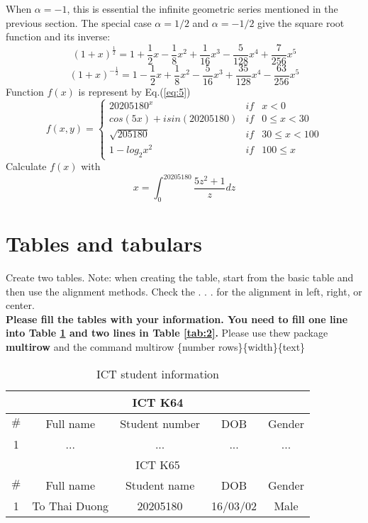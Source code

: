 \documentclass{article}
\begin{document}
When $\alpha = -1$, this is essential the infinite geometric series mentioned in the previous section. The special case $\alpha=1/2$ and $\alpha=-1/2$ give the square root function and its inverse:
\begin{equation}
(1+x)^{\frac{1}{2}}=1+\frac{1}{2}x-\frac{1}{8}x^2+\frac{1}{16}x^3-\frac{5}{128}x^4+\frac{7}{256}x^5
\end{equation}
\begin{equation}
(1+x)^{-\frac{1}{2}}=1-\frac{1}{2}x+\frac{1}{8}x^2-\frac{5}{16}x^3+\frac{35}{128}x^4-\frac{63}{256}x^5
\end{equation}
Function $f(x)$ is represent by Eq.(\ref{eq:5})
\begin{equation}
f(x,y)=
\left \{
\begin{array}{ccl}
20205180^x & if & x<0\\
cos(5x)+isin(20205180) & if & 0 \leq x < 30\\
\sqrt{205180} & if & 30 \leq x <100\\
1-log_{2}x^2 & if & 100 \leq x
\end{array}
\label{eq:5}
\right .
\end{equation}
Calculate $f(x)$ with
\begin{equation}
x=\int_{0}^{20205180}\frac{5z^2+1}{z}dz
\end{equation}
\section{Tables and tabulars}
Create two tables. Note: when creating the table, start from the basic table and then use the alignment methods. Check the . . . for the alignment in left, right, or center.\\
\textbf{Please fill the tables with your information. You need to fill one line into Table \ref{tab:1} and two lines in Table \ref{tab:2}.} Please use thew package \textbf{multirow} and the command multirow \{number rows\}\{width\}\{text\}

\begin{table}[htp]
\centering
\caption{ICT student information}
\begin{tabular}{||c|c|c|c|c||}
\hline
\multicolumn{5}{|c|}{ICT K64}\\\hline
$\#$&Full name&Student number&DOB&Gender\\\hline
1&...&...&...&...\\\hline
\multicolumn{5}{|c|}{ICT K65}\\\hline
$\#$&Full name&Student name&DOB&Gender\\\hline
1&To Thai Duong&20205180&16/03/02&Male\\\hline
\end{tabular}
\label{tab:1}
\end{table}
\end{document}
